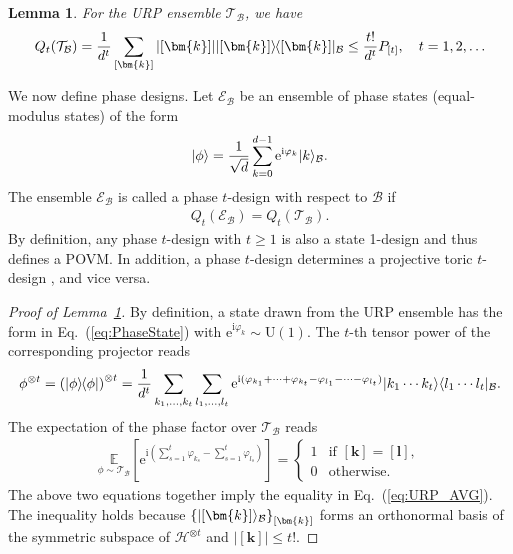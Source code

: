 \documentclass[aps,pra,twocolumn,nofootinbib,superscriptaddress,10pt]{revtex4-2}
\newtheorem{lemma}{Lemma}
\DeclarePairedDelimiter{\ket}{\lvert}{\rangle}
\DeclarePairedDelimiter{\bra}{\langle}{\rvert}
\newcommand{\ketbra}[2]{\ket{#1}\mkern-2mu\bra{#2}}
\newcommand{\proj}[1]{\ketbra{#1}{#1}}
\newcommand{\bbE}{\mathbb{E}}
\newcommand{\bmk}{\bm{k}}
\newcommand{\bml}{\bm{l}}
\newcommand{\caB}{\mathcal{B}}
\newcommand{\caE}{\mathcal{E}}
\newcommand{\caH}{\mathcal{H}}
\newcommand{\caT}{\mathcal{T}}
\newcommand{\rme}{\mathrm{e}}
\newcommand{\rmi}{\mathrm{i}}
\newcommand{\rmU}{\mathrm{U}}
\newcommand{\eref}[1]{Eq.~\textup{(\ref{#1})}}
\newcommand{\lref}[1]{Lemma~\ref{#1}}
\begin{document}

\begin{lemma}\label{lem:URPAVG}
For the URP ensemble $\caT_\caB$, we have
\begin{align}
Q_t(\caT_\caB) = \frac{1}{d^t} \sum_{[\bm{k}]} |[\bm{k}]| \proj{[\bm{k}]}_\caB\le \frac{t!}{d^t}P_{[t]},\quad t=1,2,\ldots \label{eq:URP_AVG}
\end{align}
\end{lemma}

We now define phase designs. Let $\caE_\caB$ be an ensemble of phase states (equal-modulus states) of the form
\begin{align}\label{eq:PhaseState}
\ket{\phi} = \frac{1}{\sqrt d} \sum_{k=0}^{d-1}\rme^{\rmi\varphi_k}\ket{k}_\caB.
\end{align}
The ensemble $\caE_\caB$ is called a phase $t$-design with respect to $\caB$ if
\begin{align}
Q_t(\caE_\caB) = Q_t(\caT_\caB).
\end{align}
By definition, any phase $t$-design with $t\geq 1$ is also a state 1-design and thus defines a POVM. In addition, a phase $t$-design determines a projective toric $t$-design \cite{Iosue24}, and vice versa.

\begin{proof}[Proof of \lref{lem:URPAVG}]
By definition, a state drawn from the URP ensemble has the form in \eref{eq:PhaseState} with $\rme^{\rmi\varphi_k}\sim \rmU(1)$.
The $t$-th tensor power of the corresponding projector reads
\begin{align}
\phi^{\otimes t} = \left(\proj{\phi}\right)^{\otimes t} = \frac{1}{d^t} \sum_{k_1,\dots,k_t} \sum_{l_1,\dots,l_t} \rme^{\rmi(\varphi_{k_1}+\dots+\varphi_{k_t}-\varphi_{l_1}-\dots-\varphi_{l_t})} \ket{k_1\cdots k_t}\bra{l_1\cdots l_t}_\caB.
\end{align}
The expectation of the phase factor over $\caT_\caB$ reads
\begin{align}
\underset{\phi\sim\caT_\caB}{\bbE} \left[\rme^{\rmi(\sum_{s=1}^t \varphi_{k_s} - \sum_{s=1}^t \varphi_{l_s})}\right] = \begin{cases} 1 & \text{if } [\bmk]=[\bml], \\ 0 & \text{otherwise}. \end{cases}
\end{align}
The above two equations together imply the equality in \eref{eq:URP_AVG}. The inequality holds because $\left\{\ket{[\bmk]}_\caB\right\}_{[\bmk]}$ forms an orthonormal basis of the symmetric subspace of $\caH^{\otimes t}$
and $|[\bmk]|\leq t!$.
\end{proof}
\end{document}
